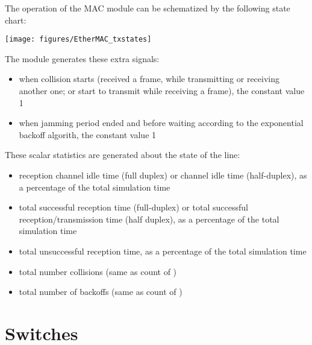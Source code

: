 The operation of the MAC module can be schematized by the following state chart:

\begin{center}
\texttt{[image: figures/EtherMAC\_txstates]}
\end{center}

The module generates these extra signals:
\begin{itemize}
\item {} when collision starts (received a frame,
         while transmitting or receiving another one; or start to transmit while receiving a frame),
         the constant value 1
\item {} when jamming period ended and before waiting according to the
         exponential backoff algorith, the constant value 1
\end{itemize}

These scalar statistics are generated about the state of the line:
\begin{itemize}
  \item {} reception channel idle time (full duplex) or channel
         idle time (half-duplex), as a percentage of the total simulation time
  \item {} total successful reception time (full-duplex) or total
         successful reception/transmission time (half duplex), as a percentage
         of the total simulation time
  \item {} total unsuccessful reception time, as a percentage
         of the total simulation time
  \item {} total number collisions (same as count of )
  \item {} total number of backoffs (same as count of )
\end{itemize}




\section{Switches}

